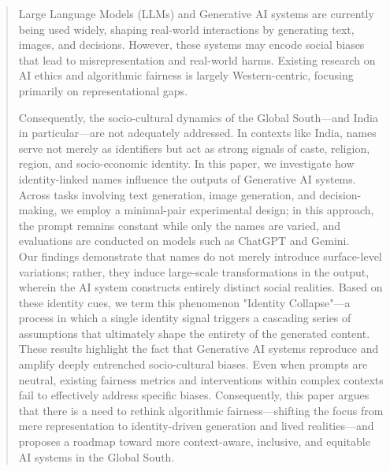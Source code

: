 \documentclass[sigplan,screen]{acmart}
\begin{document}
\begin{abstract}
Large Language Models (LLMs) and Generative AI systems are currently being used widely, shaping real-world interactions by generating text, images, and decisions. However, these systems may encode social biases that lead to misrepresentation and real-world harms. Existing research on AI ethics and algorithmic fairness is largely Western-centric, focusing primarily on representational gaps. 

Consequently, the socio-cultural dynamics of the Global South—and India in particular—are not adequately addressed. In contexts like India, names serve not merely as identifiers but act as strong signals of caste, religion, region, and socio-economic identity. In this paper, we investigate how identity-linked names influence the outputs of Generative AI systems. Across tasks involving text generation, image generation, and decision-making, we employ a minimal-pair experimental design; in this approach, the prompt remains constant while only the names are varied, and evaluations are conducted on models such as ChatGPT and Gemini.\\ Our findings demonstrate that names do not merely introduce surface-level variations; rather, they induce large-scale transformations in the output, wherein the AI ​​system constructs entirely distinct social realities. Based on these identity cues, we term this phenomenon "Identity Collapse"—a process in which a single identity signal triggers a cascading series of assumptions that ultimately shape the entirety of the generated content. \\These results highlight the fact that Generative AI systems reproduce and amplify deeply entrenched socio-cultural biases. Even when prompts are neutral, existing fairness metrics and interventions within complex contexts fail to effectively address specific biases. Consequently, this paper argues that there is a need to rethink algorithmic fairness—shifting the focus from mere representation to identity-driven generation and lived realities—and proposes a roadmap toward more context-aware, inclusive, and equitable AI systems in the Global South.
\end{abstract}


\maketitle
\end{document}
